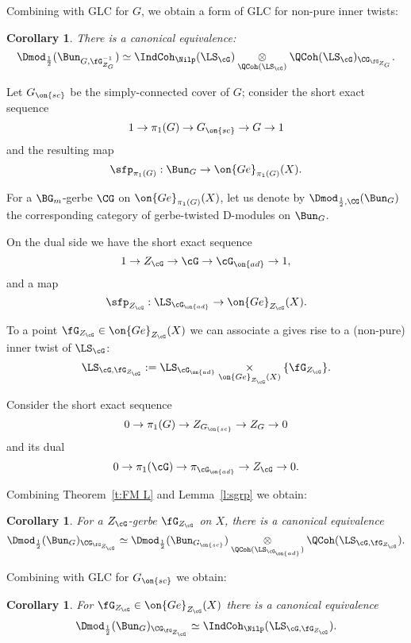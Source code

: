 \documentclass[9pt]{amsart}
\newtheorem{cor}[subsubsection]{Corollary}
\theoremstyle{remark}
\theoremstyle{definition}
\theoremstyle{remark}
\newcommand{\thmref}[1]{Theorem~\ref{#1}}
\newcommand{\lemref}[1]{Lemma~\ref{#1}}
\numberwithin{equation}{section}
\begin{document}
Combining with GLC for $G$, we obtain a form of GLC for non-pure inner twists: 

\begin{cor} \label{c:twisted GLC 1}
There is a canonical equivalence: 
$$\Dmod_{\frac{1}{2}}(\Bun_{G,\fG^{-1}_{Z_G}}) \simeq \IndCoh_\Nilp(\LS_\cG)
\underset{\QCoh(\LS_\cG)}\otimes \QCoh(\LS_\cG)_{\CG_{\fG_{Z_G}}}.$$
\end{cor} 

\sssec{}

Let $G_{\on{sc}}$ be the simply-connected cover of $G$; consider the short exact sequence
$$1\to \pi_1(G)\to G_{\on{sc}}\to G\to 1$$
and the resulting map
$$\sfp_{\pi_1(G)}:\Bun_G\to \on{Ge}_{\pi_1(G)}(X).$$

For a $\BG_m$-gerbe $\CG$ on $\on{Ge}_{\pi_1(G)}(X)$, let us denote by $\Dmod_{\frac{1}{2},\CG}(\Bun_G)$ 
the corresponding category of gerbe-twisted D-modules on $\Bun_G$. 

\sssec{}

On the dual side we have the short exact sequence
$$1\to Z_{\cG}\to \cG\to \cG_{\on{ad}}\to 1,$$
and a map
$$\sfp_{Z_\cG}:\LS_{\cG_{\on{ad}}}\to \on{Ge}_{Z_{\cG}}(X).$$

To a point $\fG_{Z_{\cG}}\in  \on{Ge}_{Z_\cG}(X)$ we can associate a 
gives rise to a (non-pure) inner twist of $\LS_\cG$: 
$$\LS_{\cG,\fG_{Z_{\cG}}}:=\LS_{\cG_{\on{ad}}}\underset{\on{Ge}_{Z_{\cG}}(X)}\times \{\fG_{Z_{\cG}}\}.$$

\sssec{}

Consider the short exact sequence
$$0\to \pi_1(G)\to Z_{G_{\on{sc}}}\to Z_G\to 0$$
and its dual
$$0\to \pi_1(\cG)\to \pi_{\cG_{\on{ad}}}\to Z_\cG\to 0.$$

Combining \thmref{t:FM L} and \lemref{l:sgrp} we obtain:

\begin{cor} \label{c:twisted LS}
For a $Z_\cG$-gerbe $\fG_{Z_{\cG}}$ on $X$, there is a canonical equivalence
$$\Dmod_{\frac{1}{2}}(\Bun_G)_{\CG_{\fG_{Z_{\cG}}}} \simeq \Dmod_{\frac{1}{2}}(\Bun_{G_{\on{sc}}}) \underset{\QCoh(\LS_{\cG_{\on{ad}}})}\otimes
\QCoh(\LS_{\cG,\fG_{Z_{\cG}}}).$$
\end{cor}

Combining with GLC for $G_{\on{sc}}$ we obtain:

\begin{cor}  \label{c:twisted GLC 2}
For $\fG_{Z_{\cG}}\in  \on{Ge}_{Z_\cG}(X)$ there is a canonical equivalence
$$\Dmod_{\frac{1}{2}}(\Bun_G)_{\CG_{\fG_{Z_{\cG}}}} \simeq \IndCoh_\Nilp(\LS_{\cG,\fG_{Z_{\cG}}}).$$
\end{cor}
\end{document}
